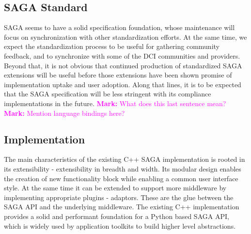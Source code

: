 \documentclass{article}
\newcommand{\I}[1]{\textit{#1}}
\newcommand{\B}[1]{\textbf{#1}}
\newcommand{\todo}[1]{{\textcolor{red}{\B{TODO:} #1 }}}
\newcommand{\msnote}[1]{{\textcolor{magenta}{ \B{Mark:    } #1 }}}
\newcommand{\msnote}[1]{}
\begin{document}
  


 \subsection{SAGA Standard}

  SAGA seems to have a solid specification foundation, whose
  maintenance will focus on synchronization with other
  standardization efforts.  At the same time, we expect the
  standardization process to be useful for gathering community
  feedback, and to synchronize with some of the DCI communities and
  providers.  Beyond that, it is not obvious that continued production
  of standardized SAGA extensions will be useful before those
  extensions have been shown promise of implementation uptake and user
  adoption.  Along that lines, it is to be expected that the SAGA
  specification will be less stringent with its compliance
  implementations in the future.
  \msnote{What does this last sentence mean?}
  \msnote{Mention language bindings here?}
  


 \subsection{Implementation}

  The main characteristics of the existing C++ SAGA implementation is
  rooted in its extensibility - extensibility in breadth and width.
  Its modular design enables the creation of new functionality block
  while enabling a common user interface style.  At the same time it
  can be extended to support more middleware by implementing
  appropriate plugins - adaptors. These are the glue between the SAGA
  API and the underlying middleware. The existing C++ implementation
  provides a solid and performant foundation for a Python based SAGA
  API, which is widely used by application toolkits to build higher
  level abstractions.
\end{document}
